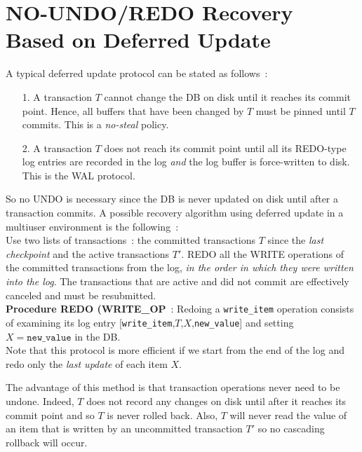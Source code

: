 \section{NO-UNDO/REDO Recovery Based on Deferred Update}
\label{chap22-deferred}
A typical deferred update protocol can be stated as follows~:

\begin{itemize}
    \item[1.] A transaction $T$ cannot change the DB on disk until it reaches its commit point. Hence, all buffers that have been changed by $T$ must be pinned until $T$ commits. This is a \textit{no-steal} policy.
    \item[2.] A transaction $T$ does not reach its commit point until all its REDO-type log entries are recorded in the log \textit{and} the log buffer is force-written to disk. This is the WAL protocol.
\end{itemize}

So no UNDO is necessary since the DB is never updated on disk until after a transaction commits. A possible recovery algorithm using deferred update in a multiuser environment is the following~: \\

Use two lists of transactions~: the committed transactions $T$ since the \textit{last checkpoint} and the active transactions $T'$. REDO all the WRITE operations of the committed transactions from the log, \textit{in the order in which they were written into the log}. The transactions that are active and did not commit are effectively canceled and must be resubmitted. \\

\label{chap22-redo-proc}
\textbf{Procedure REDO (WRITE\_OP}~: Redoing a \texttt{write\_item} operation consists of examining its log entry [\texttt{write\_item},$T$,$X$,\texttt{new\_value}] and setting $X=\texttt{new\_value}$ in the DB. \\

Note that this protocol is more efficient if we start from the end of the log and redo only the \textit{last update} of each item $X$.

The advantage of this method is that transaction operations never need to be undone. Indeed, $T$ does not record any changes on disk until after it reaches its commit point and so $T$ is never rolled back. Also, $T$ will never read the value of an item that is written by an uncommitted transaction $T'$ so no cascading rollback will occur. \\

